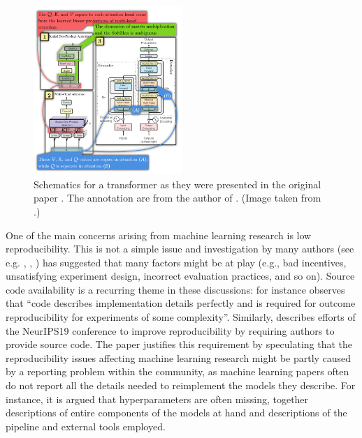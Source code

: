\documentclass[11pt,a4paper,openright,twoside]{report}
\theoremstyle{plain}
\theoremstyle{definition}
\newcommand\dblquote[1]{\textquotedblleft #1\textquotedblright}
\begin{document}
\begin{figure}[h]
  \begin{center}
    \includegraphics[width=0.5\textwidth]{figures/transformer_original.png}     
    \caption[Diagram of a transformer]{Schematics for a transformer as they were presented in the original paper \cite{vaswani2017attention}. The annotation are from the author of \cite{abbott2024neural}. (Image taken from \cite{abbott2023robust}.)}
    \label{fig: transformer}
  \end{center}
\end{figure}

One of the main concerns arising from machine learning research is low reproducibility. This is not a simple issue and investigation by many authors (see e.g. \cite{raff2019step}, \cite{pineau2021improving}, \cite{gundersen2022sources}) has suggested that many factors might be at play (e.g., bad incentives, unsatisfying experiment design, incorrect evaluation practices, and so on). Source code availability is a recurring theme in these discussions: for instance \cite{gundersen2022sources} observes that \dblquote{code describes implementation details perfectly and is required for outcome reproducibility for experiments of some complexity}. Similarly, \cite{pineau2021improving} describes efforts of the NeurIPS19 conference to improve reproducibility by requiring authors to provide source code. The paper justifies this requirement by speculating that the reproducibility issues affecting machine learning research might be partly caused by a reporting problem within the community, as machine learning papers often do not report all the details needed to reimplement the models they describe. For instance, it is argued that hyperparameters are often missing, together descriptions of entire components of the models at hand and descriptions of the pipeline and external tools employed.
\end{document}
